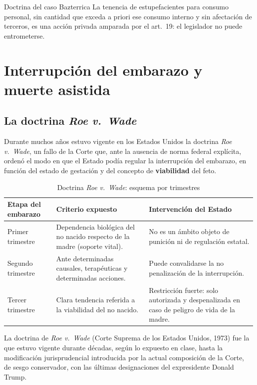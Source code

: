 \documentclass[12pt,oneside]{book}
\begin{document}
\begin{definition}{Doctrina del caso Bazterrica}
La tenencia de estupefacientes para consumo personal, sin cantidad que exceda a priori ese consumo interno y sin afectación de terceros, es una acción privada amparada por el art.\ 19: el legislador no puede entrometerse.
\end{definition}

\section{Interrupción del embarazo y muerte asistida}

\subsection{La doctrina \emph{Roe v.\ Wade}}

Durante muchos años estuvo vigente en los Estados Unidos la doctrina \emph{Roe v.\ Wade}, un fallo de la Corte que, ante la ausencia de norma federal explícita, ordenó el modo en que el Estado podía regular la interrupción del embarazo, en función del estado de gestación y del concepto de \textbf{viabilidad} del feto.

\begin{table}[H]
\centering
\caption{Doctrina \emph{Roe v.\ Wade}: esquema por trimestres}
\begin{tabularx}{\textwidth}{>{\raggedright\arraybackslash}p{} X X}
\toprule
\textbf{Etapa del embarazo} & \textbf{Criterio expuesto} & \textbf{Intervención del Estado} \\
\midrule
Primer trimestre & Dependencia biológica del no nacido respecto de la madre (soporte vital). & No es un ámbito objeto de punición ni de regulación estatal. \\
Segundo trimestre & Ante determinadas causales, terapéuticas y determinadas acciones. & Puede convalidarse la no penalización de la interrupción. \\
Tercer trimestre & Clara tendencia referida a la viabilidad del no nacido. & Restricción fuerte: solo autorizada y despenalizada en caso de peligro de vida de la madre. \\
\bottomrule
\end{tabularx}
\end{table}

\begin{note}
La doctrina de \emph{Roe v.\ Wade} (Corte Suprema de los Estados Unidos, 1973) fue la que estuvo vigente durante décadas, según lo expuesto en clase, hasta la modificación jurisprudencial introducida por la actual composición de la Corte, de sesgo conservador, con las últimas designaciones del expresidente Donald Trump.
\end{note}
\end{document}
